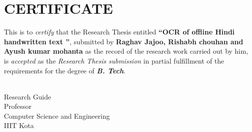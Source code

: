 \chapter*{CERTIFICATE}
\thispagestyle{empty}

\doublespace

\qquad 

\vspace*{0.5in}
\indent This is to \textit{certify} that the Research Thesis entitled {\bf \textquotedblleft{OCR of offline Hindi handwritten text \textquotedblright}}, submitted by {\bf Raghav Jajoo, Rishabh chouhan and Ayush kumar mohanta} as the record of the research work carried out by him, is \textit{accepted} as the \textit{Research Thesis submission} in partial fulfillment of the requirements for the degree of {\bf\textit{B. Tech}}.

\vspace*{1in}

\begin{singlespace}
\hspace*{1.5in} 
\parbox{3in}
{ \\
\noindent Research Guide \\ 
\noindent Professor\\
\noindent Computer Science and Engineering\\
\noindent IIIT Kota }

\end{singlespace} 
\vspace*{0.25in}
\par\newpage